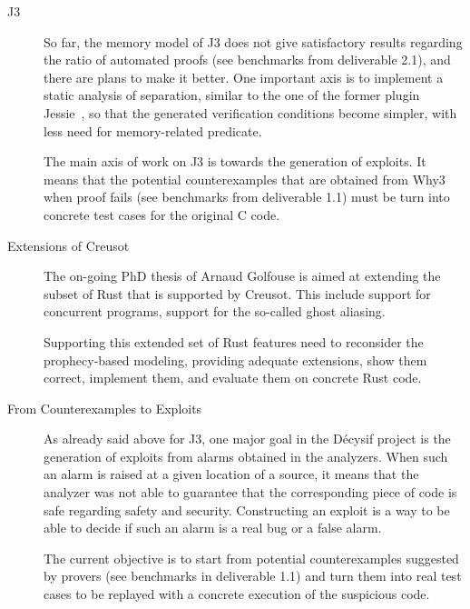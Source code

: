 \documentclass[a4paper,11pt]{article}
\begin{document}
\begin{description}
\item[J3]


  So far, the memory model of J3 does not give satisfactory results regarding
  the ratio of automated proofs (see benchmarks from deliverable 2.1), and
  there are plans to make it better. One important axis is to implement a static
  analysis of separation, similar to the one of the former plugin
  Jessie~\cite{hubert2008these,hubert07hav}, so that the generated verification
  conditions become simpler, with less need for memory-related predicate.

  The main axis of work on J3 is towards the generation of exploits. It means
  that the potential counterexamples that are obtained from Why3 when proof
  fails (see benchmarks from deliverable 1.1) must be turn into concrete test
  cases for the original C code.

\item[Extensions of Creusot]


  The on-going PhD thesis of Arnaud Golfouse is aimed at extending the subset of
  Rust that is supported by Creusot. This include support for concurrent
  programs, support for the so-called ghost aliasing.

  Supporting this extended set of Rust features need to reconsider the
  prophecy-based modeling, providing adequate extensions, show them correct,
  implement them, and evaluate them on concrete Rust code.

\item[From Counterexamples to Exploits]


  As already said above for J3, one major goal in the Décysif project is the
  generation of exploits from alarms obtained in the analyzers. When such an
  alarm is raised at a given location of a source, it means that the analyzer
  was not able to guarantee that the corresponding piece of code is safe
  regarding safety and security. Constructing an exploit is a way to be able to
  decide if such an alarm is a real bug or a false alarm.

  The current objective is to start from potential counterexamples suggested by
  provers (see benchmarks in deliverable 1.1) and turn them into real test cases
  to be replayed with a concrete execution of the suspicious code.


\end{description}
\end{document}
